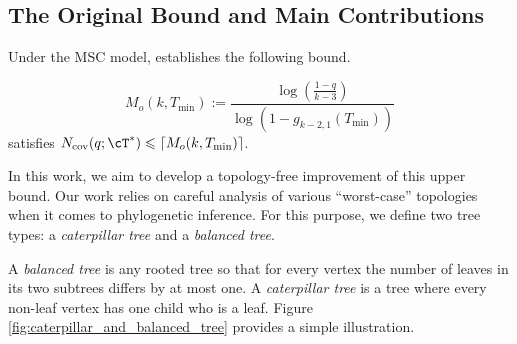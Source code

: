 \subsection{The Original Bound and Main Contributions}
\label{sec:original-bound-main-results}

Under the MSC model, \cite{uricchio2016_bipartition_cover} establishes the following bound.

\begin{theorem}
\label{thm:uricchios_bipartition_cover_bound}
%
\begin{equation}
     M_o(k,T_{\mathrm{min}}) := \frac{\log\left(\frac{1-q}{k-3}\right)}{\log \left(1-g_{k-2, 1}(T_{\mathrm{min}})\right)}
     \label{eqn:uricchios_bipartition_cover_bound}
\end{equation}
%
\noindent satisfies $N_{\mathrm{cov}}(q;\cT^*)\leq \lceil M_o(k,T_{\mathrm{min}})\rceil$.
\end{theorem}


\noindent In this work, we aim to develop a topology-free improvement of this upper bound.
Our work relies on careful analysis of various ``worst-case'' topologies when it comes to phylogenetic inference. For this purpose, we define two tree types: a \textit{caterpillar tree} and a \textit{balanced tree}.

A \textit{balanced tree} is any rooted tree so that for every vertex the number of leaves in its two subtrees differs by at most one. A \textit{caterpillar tree} is a tree where every non-leaf vertex has one child who is a leaf. Figure \ref{fig:caterpillar_and_balanced_tree} provides a simple illustration.

